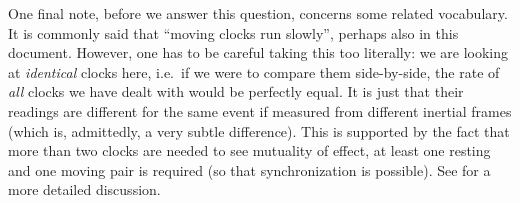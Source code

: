 \documentclass[../relativity_main.tex]{subfiles}
\begin{document}


%	
%	
%	




One final note, before we answer this question, concerns some related vocabulary. It is commonly said that \enquote{moving clocks run slowly}, perhaps also in this document. However, one has to be careful taking this too literally: we are looking at \emph{identical} clocks here, i.e.~if we were to compare them side-by-side, the rate of \emph{all} clocks we have dealt with would be perfectly equal. It is just that their readings are different for the same event if measured from different inertial frames (which is, admittedly, a very subtle difference). This is supported by the fact that more than two clocks are needed to see mutuality of effect, at least one resting and one moving pair is required (so that synchronization is possible). See \cite{giulini_srt} for a more detailed discussion.




\end{document}
